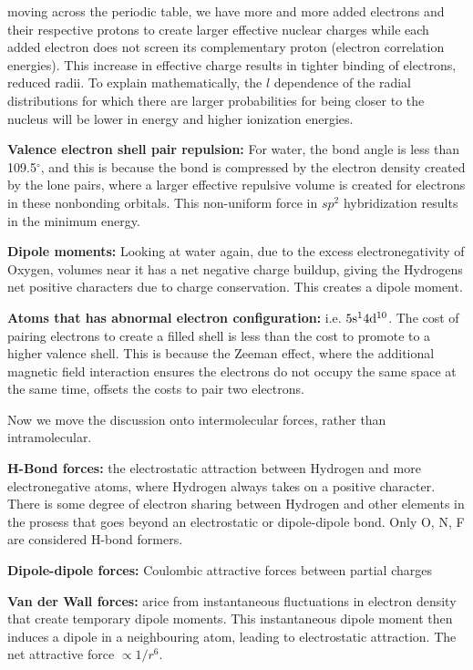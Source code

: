 \documentclass[11pt,fleqn]{book}
\begin{document}
moving across the periodic table, we have more and more added electrons and their respective protons to create larger effective nuclear charges while each added electron does not screen its complementary proton (electron correlation energies). This increase in effective charge results in tighter binding of electrons, reduced radii. To explain mathematically, the $l$ dependence of the radial distributions for which there are larger probabilities for being closer to the nucleus will be lower in energy and higher ionization energies.

\textbf{Valence electron shell pair repulsion: }For water, the bond angle is less than 109.5$^\circ$, and this is because the bond is compressed by the electron density created by the lone pairs, where a larger effective repulsive volume is created for electrons in these nonbonding orbitals. This non-uniform force in $sp^2$ hybridization results in the minimum energy.

\textbf{Dipole moments: }Looking at water again, due to the excess electronegativity  of Oxygen, volumes near it has a net negative charge buildup, giving the Hydrogens net positive characters due to charge conservation. This creates a dipole moment.

\textbf{Atoms that has abnormal electron configuration: }i.e. $\rm 5s^14d^{10}$. The cost of pairing electrons to create a filled shell is less than the cost to promote to a higher valence shell. This is because the Zeeman effect, where the additional magnetic field interaction ensures the electrons do not occupy the same space at the same time, offsets the costs to pair two electrons. 

Now we move the discussion onto intermolecular forces, rather than intramolecular.

\textbf{H-Bond forces: }the electrostatic attraction between Hydrogen and more electronegative atoms, where Hydrogen always takes on a positive character. There is some degree of electron sharing between Hydrogen and other elements in the prosess that goes beyond an electrostatic or dipole-dipole bond. Only O, N, F are considered H-bond formers.

\textbf{Dipole-dipole forces: }Coulombic attractive forces between partial charges

\textbf{Van der Wall forces: }arice from instantaneous fluctuations in electron density that create temporary dipole moments. This instantaneous dipole moment then induces a dipole in a neighbouring atom, leading to electrostatic attraction. The net attractive force $\propto 1/r^6$.
\end{document}
